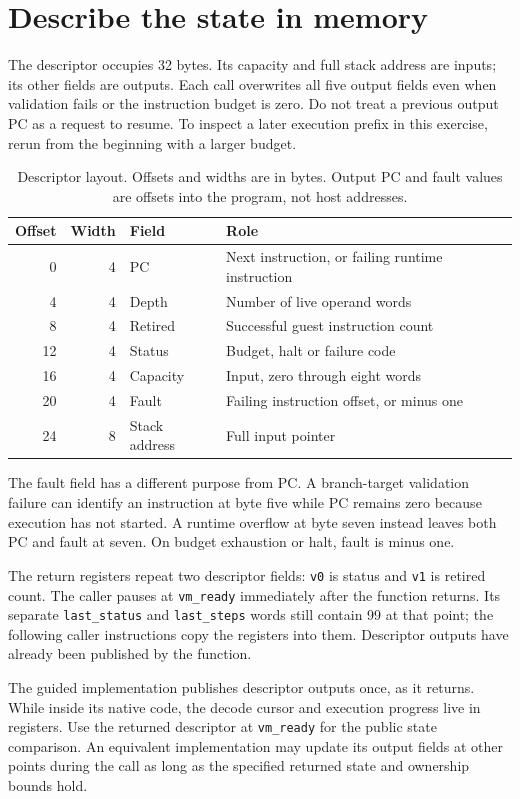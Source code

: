 \section{Describe the state in memory}\label{vm-state}
The descriptor occupies 32 bytes. Its capacity and full stack address are inputs;
its other fields are outputs. Each call overwrites all five output fields even when
validation fails or the instruction budget is zero. Do not treat a previous output
PC as a request to resume. To inspect a later execution prefix in this exercise,
rerun from the beginning with a larger budget.

\begin{table}[htbp]
  \centering
  \caption{Descriptor layout. Offsets and widths are in bytes. Output PC and fault values are offsets into the program, not host addresses.}
  \begin{tabular}{rrll}
    \toprule
    Offset & Width & Field         & Role                                             \\
    \midrule
    0      & 4     & PC            & Next instruction, or failing runtime instruction \\
    4      & 4     & Depth         & Number of live operand words                     \\
    8      & 4     & Retired       & Successful guest instruction count               \\
    12     & 4     & Status        & Budget, halt or failure code                     \\
    16     & 4     & Capacity      & Input, zero through eight words                  \\
    20     & 4     & Fault         & Failing instruction offset, or minus one         \\
    24     & 8     & Stack address & Full input pointer                               \\
    \bottomrule
  \end{tabular}
\end{table}

The fault field has a different purpose from PC. A branch-target validation failure
can identify an instruction at byte five while PC remains zero because execution has
not started. A runtime overflow at byte seven instead leaves both PC and fault at
seven. On budget exhaustion or halt, fault is minus one.

The return registers repeat two descriptor fields: \texttt{v0} is status and
\texttt{v1} is retired count. The caller pauses at \texttt{vm\_ready} immediately
after the function returns. Its separate \texttt{last\_status} and
\texttt{last\_steps} words still contain 99 at that point; the following caller
instructions copy the registers into them. Descriptor outputs have already been
published by the function.

The guided implementation publishes descriptor outputs once, as it returns. While
inside its native code, the decode cursor and execution progress live in registers.
Use the returned descriptor at \texttt{vm\_ready} for the public state comparison.
An equivalent implementation may update its output fields at other points during the
call as long as the specified returned state and ownership bounds hold.
